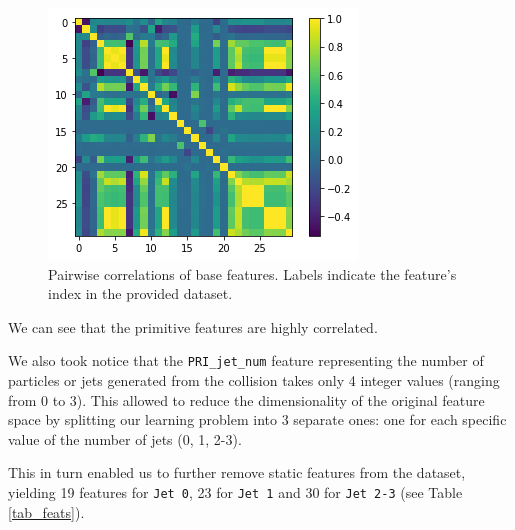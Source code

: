 \documentclass[10pt,conference,compsocconf]{IEEEtran}
\begin{document}
\begin{figure}[H]
\centering
\includegraphics[width=\linewidth]{corr.png}

\cprotect\caption{Pairwise correlations of base features. Labels indicate the feature's index in the provided dataset. }
\label{fig_corr}
\end{figure}

We can see that the primitive features are highly correlated.

We also took notice that the \verb+PRI_jet_num+ feature representing the number of particles or jets generated from the collision takes only 4 integer values (ranging from 0 to 3). This allowed to reduce the dimensionality of the original feature space by splitting our learning problem into 3 separate ones: one for each specific value of the number of jets (0, 1, 2-3).

This in turn enabled us to further remove static features from the dataset, yielding 19 features for  \verb+Jet 0+, 23 for \verb+Jet 1+ and 30 for \verb+Jet 2-3+ (see Table \ref{tab_feats}).
\end{document}
